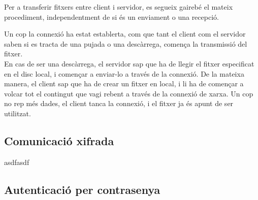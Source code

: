 Per a transferir fitxers entre client i servidor, es segueix gairebé el mateix procediment, independentment de si és un enviament o una recepció.

Un cop la connexió ha estat establerta, com que tant el client com el servidor saben si es tracta de una pujada o una descàrrega, comença la transmissió
del fitxer. \\

En cas de ser una descàrrega, el servidor sap que ha de llegir el fitxer especificat en el disc local, i començar a enviar-lo a través de la connexió. 
De la mateixa manera, el client sap que ha de crear un fitxer en local, i li ha de començar a volcar tot el contingut que vagi rebent a través de
la connexió de xarxa. Un cop no rep més dades, el client tanca la connexió, i el fitxer ja és apunt de ser utilitzat.

\subsection{Comunicació xifrada}
asdfasdf
\subsection{Autenticació per contrasenya}
